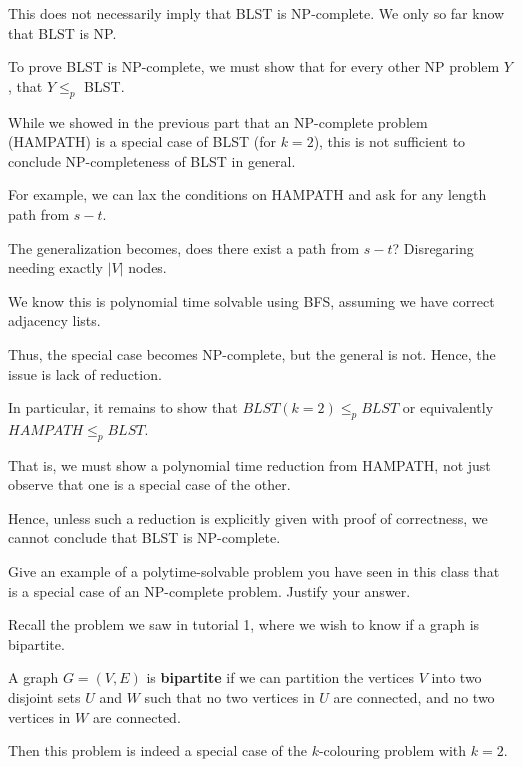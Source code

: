 \begin{questions}
	\ifsolutions\fi

	\begin{soln}
		This does not necessarily imply that BLST is NP-complete. We only so far know that BLST is NP.

		To prove BLST is NP-complete, we must show that for every other NP problem \(Y\), that \(Y \leq_p\) BLST.

		While we showed in the previous part that an NP-complete problem (HAMPATH) is a special case of BLST (for \( k = 2 \)), this is not sufficient to conclude NP-completeness of BLST in general.

		For example, we can lax the conditions on HAMPATH and ask for any length path from \(s - t\).

		The generalization becomes, does there exist a path from \(s - t\)? Disregaring needing exactly \(|V|\) nodes.

		We know this is polynomial time solvable using BFS, assuming we have correct adjacency lists.

		Thus, the special case becomes NP-complete, but the general is not. Hence, the issue is lack of reduction.

		In particular, it remains to show that \(BLST(k = 2) \leq_p BLST\) or equivalently \(HAMPATH \leq_p BLST\).

		That is, we must show a polynomial time reduction from HAMPATH, not just observe that one is a special case of the other.

		Hence, unless such a reduction is explicitly given with proof of correctness, we cannot conclude that BLST is NP-complete.
	\end{soln}


	\question[4] Give an example of a polytime-solvable problem you have seen in this class that is a special case of an NP-complete problem. Justify your answer.

	\ifsolutions\fi

	\begin{soln}
		Recall the problem we saw in tutorial 1, where we wish to know if a graph is bipartite.

		A graph \( G = (V, E) \) is \textbf{bipartite} if we can partition the vertices \( V \) into two disjoint sets \( U \) and \( W \) such that no two vertices in \( U \) are connected, and no two vertices in \( W \) are connected.

		Then this problem is indeed a special case of the \( k \)-colouring problem with \( k = 2 \).


\end{soln}
\end{questions}

